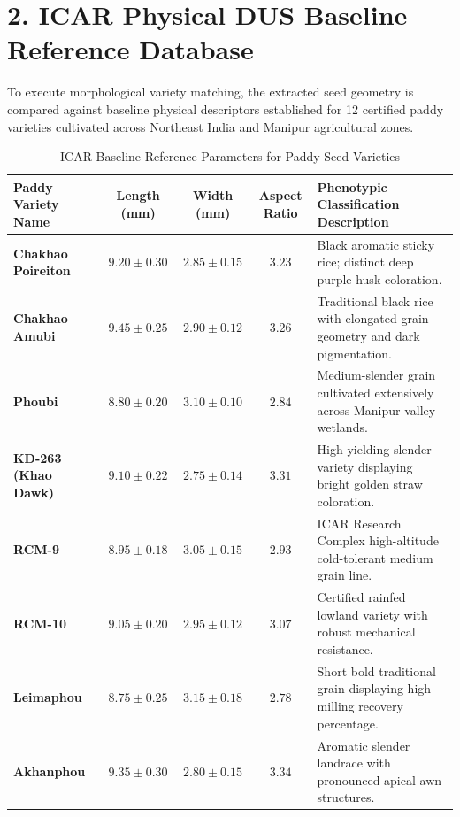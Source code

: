 \section*{2. ICAR Physical DUS Baseline Reference Database}

To execute morphological variety matching, the extracted seed geometry is compared against baseline physical descriptors established for 12 certified paddy varieties cultivated across Northeast India and Manipur agricultural zones.

\begin{table}[htbp]
  \centering
  \caption{ICAR Baseline Reference Parameters for Paddy Seed Varieties}
  \label{tab:app-dusdatabase}
  \renewcommand{\arraystretch}{1.35}
  \begin{tabularx}{\textwidth}{@{} l c c c X @{}}
    \toprule
    \textbf{Paddy Variety Name} & \textbf{Length (mm)} & \textbf{Width (mm)} & \textbf{Aspect Ratio} & \textbf{Phenotypic Classification Description} \\
    \midrule
    \textbf{Chakhao Poireiton} & $9.20 \pm 0.30$ & $2.85 \pm 0.15$ & $3.23$ & Black aromatic sticky rice; distinct deep purple husk coloration. \\
    \addlinespace
    \textbf{Chakhao Amubi} & $9.45 \pm 0.25$ & $2.90 \pm 0.12$ & $3.26$ & Traditional black rice with elongated grain geometry and dark pigmentation. \\
    \addlinespace
    \textbf{Phoubi} & $8.80 \pm 0.20$ & $3.10 \pm 0.10$ & $2.84$ & Medium-slender grain cultivated extensively across Manipur valley wetlands. \\
    \addlinespace
    \textbf{KD-263 (Khao Dawk)} & $9.10 \pm 0.22$ & $2.75 \pm 0.14$ & $3.31$ & High-yielding slender variety displaying bright golden straw coloration. \\
    \addlinespace
    \textbf{RCM-9} & $8.95 \pm 0.18$ & $3.05 \pm 0.15$ & $2.93$ & ICAR Research Complex high-altitude cold-tolerant medium grain line. \\
    \addlinespace
    \textbf{RCM-10} & $9.05 \pm 0.20$ & $2.95 \pm 0.12$ & $3.07$ & Certified rainfed lowland variety with robust mechanical resistance. \\
    \addlinespace
    \textbf{Leimaphou} & $8.75 \pm 0.25$ & $3.15 \pm 0.18$ & $2.78$ & Short bold traditional grain displaying high milling recovery percentage. \\
    \addlinespace
    \textbf{Akhanphou} & $9.35 \pm 0.30$ & $2.80 \pm 0.15$ & $3.34$ & Aromatic slender landrace with pronounced apical awn structures. \\

\end{tabularx}
\end{table}
